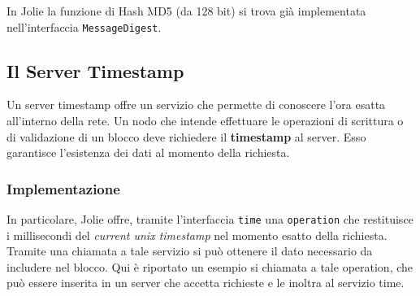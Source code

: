 \noindent In Jolie la funzione di Hash MD5 (da 128 bit) si trova già implementata nell'interfaccia \texttt{MessageDigest}.
%

%

\subsection{Il Server Timestamp}
Un server timestamp offre un servizio che permette di conoscere l'ora esatta all'interno della rete. Un nodo che intende effettuare le operazioni di scrittura o di validazione di un blocco deve richiedere il \textbf{timestamp} al server. Esso garantisce l'esistenza dei dati al momento della richiesta.

\subsubsection{Implementazione}
In particolare, Jolie offre, tramite l'interfaccia \texttt{time} una \texttt{operation} che restituisce i millisecondi del \textit{current unix timestamp} nel momento esatto della richiesta. Tramite una chiamata a tale servizio si può ottenere il dato necessario da includere nel blocco. Qui è riportato un esempio si chiamata a tale operation, che può essere inserita in un server che accetta richieste e le inoltra al servizio time.
%

%

